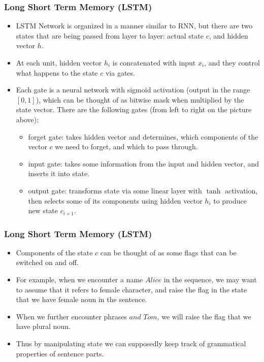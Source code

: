 \begin{frame}[fragile] \frametitle{Long Short Term Memory (LSTM)}


\begin{itemize}
\item LSTM Network is organized in a manner similar to RNN, but there are two states that are being passed from layer to layer: actual state $c$, and hidden vector $h$. \item At each unit, hidden vector $h_i$ is concatenated with input $x_i$, and they control what happens to the state $c$ via gates. 
\item Each gate is a neural network with sigmoid activation (output in the range $[0,1]$), which can be thought of as bitwise mask when multiplied by the state vector. There are the following gates (from left to right on the picture above):

\begin{itemize}
\item forget gate: takes hidden vector and determines, which components of the vector $c$ we need to forget, and which to pass through. 
\item input gate: takes some information from the input and hidden vector, and inserts it into state.
\item output gate: transforms state via some linear layer with $\tanh$ activation, then selects some of its components using hidden vector $h_i$ to produce new state $c_{i+1}$.
\end{itemize}

\end{itemize}


\end{frame}

\begin{frame}[fragile] \frametitle{Long Short Term Memory (LSTM)}


\begin{itemize}

\item Components of the state $c$ can be thought of as some flags that can be switched on and off. 
\item For example, when we encounter a name $Alice$ in the sequence, we may want to assume that it refers to female character, and raise the flag in the state that we have female noun in the sentence. 
\item When we further encounter phrases $and$ $Tom$, we will raise the flag that we have plural noun. 
\item Thus by manipulating state we can supposedly keep track of grammatical properties of sentence parts.

\end{itemize}


\end{frame}

